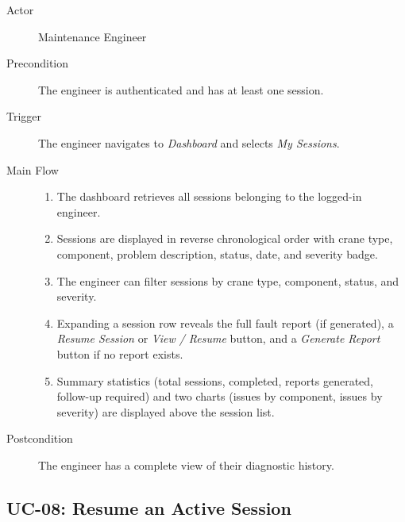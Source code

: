 \begin{description}
    \item[Actor] Maintenance Engineer
    \item[Precondition] The engineer is authenticated and has at least one session.
    \item[Trigger] The engineer navigates to \textit{Dashboard} and selects
                   \textit{My Sessions}.
    \item[Main Flow]
        \begin{enumerate}[noitemsep]
            \item The dashboard retrieves all sessions belonging to the logged-in engineer.
            \item Sessions are displayed in reverse chronological order with crane type,
                  component, problem description, status, date, and severity badge.
            \item The engineer can filter sessions by crane type, component, status,
                  and severity.
            \item Expanding a session row reveals the full fault report (if generated),
                  a \textit{Resume Session} or \textit{View / Resume} button, and a
                  \textit{Generate Report} button if no report exists.
            \item Summary statistics (total sessions, completed, reports generated,
                  follow-up required) and two charts (issues by component, issues by
                  severity) are displayed above the session list.
        \end{enumerate}
    \item[Postcondition] The engineer has a complete view of their diagnostic history.
\end{description}

\subsection{UC-08: Resume an Active Session\label{sec:uc08}}

